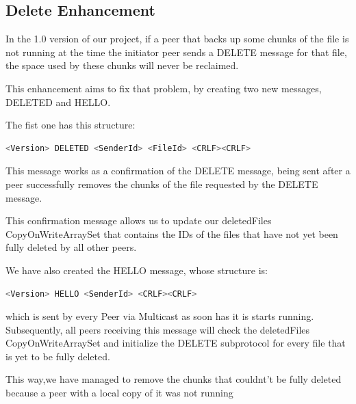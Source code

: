 \documentclass[11pt]{article}
\begin{document}
\pagebreak

\subsection{Delete Enhancement}

In the 1.0 version of our project, if a peer that backs up some chunks of the file is not running at the time the initiator peer sends a DELETE message for that file, the space used by these chunks will never be reclaimed.

This enhancement aims to fix that problem, by creating two new messages, DELETED and HELLO.

The fist one has this structure:
\begin{lstlisting}[language=java]
   <Version> DELETED <SenderId> <FileId> <CRLF><CRLF>
\end{lstlisting}

This message works as a confirmation of the DELETE message, being sent after a peer successfully removes the chunks of the file requested by the DELETE message.

This confirmation message allows us to update our deletedFiles CopyOnWriteArraySet that contains the IDs of the files that have not yet been fully deleted by all other peers.

We have also created the HELLO message, whose structure is:
\begin{lstlisting}[language=java]
   <Version> HELLO <SenderId> <CRLF><CRLF>
\end{lstlisting}


which is sent by every Peer via Multicast as soon has it is starts running. Subsequently, all peers receiving this message will check the deletedFiles CopyOnWriteArraySet and initialize the DELETE subprotocol for every file that is yet to be fully deleted.

This way,we have managed to remove the chunks that couldnt't be fully deleted because a peer with a local copy of it was not running
\end{document}
